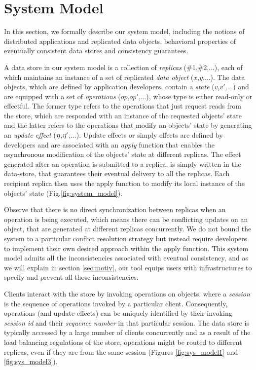 \newpage
\section{System Model}
In this section, we formally describe our system model, including the
notions of distributed applications and replicated data objects,
behavioral properties of eventually consistent data stores and
consistency guarantees.


A data store in our system model is a collection of \emph{replicas}
(\#1,\#2,...),
each of which maintains an instance of a set of  replicated \emph{data
object} ($x$,$y$,...).
The data objects,
which are defined by application developers, contain a \emph{state}
($v$,$v'$,...) and
are equipped with a set of \emph{operations} ($op$,$op'$,...), whose
type is either
read-only or effectful. 
The former type refers to the operations that just request reads from the
store, which are responded with an instance of the requested objects' state and the
latter refers to the operations that modify an objects' state by generating
an \emph{update effect} ($\eta$,$\eta'$,...).  Update effects or simply effects
are defined by
developers and are associated with an \emph{apply} function that enables
the asynchronous modification of the objects' state at different replicas.
The effect generated after an operation is submitted to a replica, is
simply written in the data-store, that guarantees
their eventual delivery to all the replicas. Each recipient replica then
uses the apply function to modify its local instance of the objects'
state  (Fig.\ref{fig:system_model}).

Observe that there is no direct synchronization between replicas when an
operation is being executed, which means there can be conflicting
updates on an object, that are generated at different replicas
concurrently. 
We do not bound the system to a particular
conflict resolution strategy but instead require developers to implement
their own desired approach within the apply function. This system model
admits all the inconsistencies associated with eventual consistency, and
as we will explain in section \ref{sec:motiv}, our tool equips users
with infrastructures to specify and prevent all those inconsistencies.

Clients interact
with the store by invoking operations on objects, where a \emph{session} is
the sequence of operations invoked by a particular client. Consequently,
operations
(and update effects) can be uniquely identified by
their invoking \emph{session id} and their \emph{sequence number} in
that particular session. The data store is typically accessed by a large
number of clients concurrently and as a result of the load balancing
regulations of the store, operations might be routed to different replicas,
even if they are from the same session (Figures \ref{fig:sys_model1} and
\ref{fig:sys_model3}).

